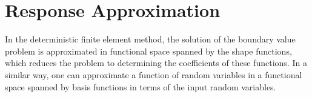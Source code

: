 \section{Response Approximation}

In the deterministic finite element method, the solution of the boundary value problem is approximated in functional space spanned by the shape functions, which reduces the problem to determining the coefficients of these functions. 
In a similar way, one can approximate a function of random variables in a functional space spanned by basis functions in terms of the input random variables.



